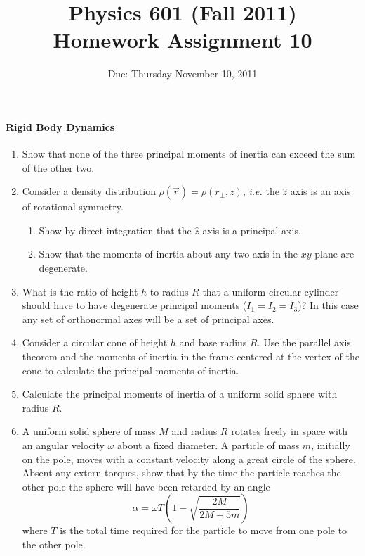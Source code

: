 \documentclass[letterpaper,11pt]{article}
\title{Physics 601 (Fall 2011) \\ Homework Assignment 10}
\date{Due: Thursday November 10, 2011}
\begin{document}
\maketitle

\paragraph*{Rigid Body Dynamics}
\begin{enumerate}
 \item Show that none of the three principal moments of inertia can exceed the sum of the other two.
 \item Consider a density distribution $\rho(\vec{r}) = \rho(r_\perp,z)$, \textit{i.e.} the $\hat{z}$ axis is an axis of rotational symmetry.
 \begin{enumerate}
  \item Show by direct integration that the $\hat{z}$ axis is a principal axis.
  \item Show that the moments of inertia about any two axis in the $xy$ plane are degenerate.
 \end{enumerate}
 \item What is the ratio of height $h$ to radius $R$ that a uniform circular cylinder should have to have degenerate principal moments ($I_1 = I_2 = I_3$)?  In this case any set of orthonormal axes will be a set of principal axes.
 \item Consider a circular cone of height $h$ and base radius $R$.  Use the parallel axis theorem and the moments of inertia in the frame centered at the vertex of the cone to calculate the principal moments of inertia.
 \item Calculate the principal moments of inertia of a uniform solid sphere with radius $R$.
 \item A uniform solid sphere of mass $M$ and radius $R$ rotates freely in space with an angular velocity $\omega$ about a fixed diameter.  A particle of mass $m$, initially on the pole, moves with a constant velocity along a great circle of the sphere.  Absent any extern torques, show that by the time the particle reaches the other pole the sphere will have been retarded by an angle
 \begin{equation*}
  \alpha = \omega T \left( 1 - \sqrt{\frac{2M}{2M + 5m}} \right)
 \end{equation*}
 where $T$ is the total time required for the particle to move from one pole to the other pole.
\end{enumerate}
\end{document}
